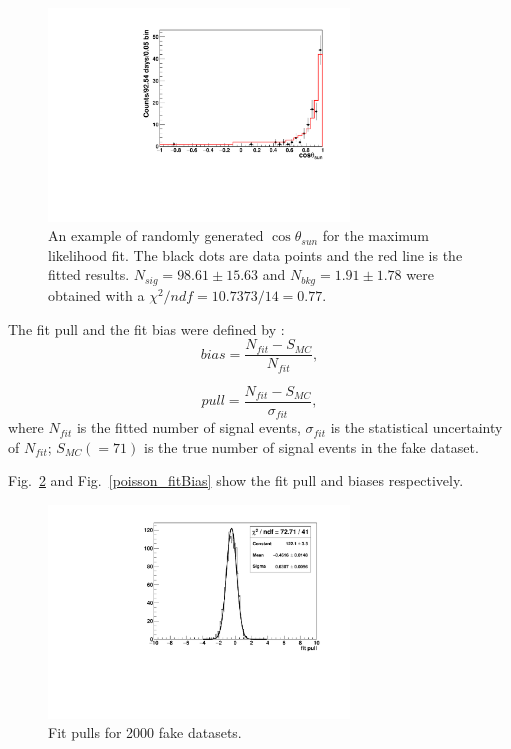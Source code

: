 \begin{figure}[!htb]
	\centering
	\includegraphics[width=8cm]{ensemble_fitExample.pdf}
	\caption{An example of randomly generated $\cos\theta_{sun}$ for the maximum likelihood fit. The black dots are data points and the red line is the fitted results. 
	$N_{sig} = 98.61\pm15.63$ and $N_{bkg} = 1.91 \pm 1.78$ were obtained with a $\chi^2/ndf = 10.7373/14 = 0.77$.}
	\label{ensemble_test}
\end{figure} 

The fit pull and the fit bias were defined by \cite{leta}:
\begin{equation}
bias=\frac{N_{fit}-S_{MC}}{N_{fit}},
\end{equation}

\begin{equation}
pull=\frac{N_{fit}-S_{MC}}{\sigma_{fit}},
\end{equation}
where $N_{fit}$ is the fitted number of signal events, $\sigma_{fit}$ is the statistical uncertainty of $N_{fit}$; $S_{MC}(=71)$ is the true number of signal events in the fake dataset.

Fig.~\ref{poisson_fitPull} and Fig.~\ref{poisson_fitBias} show the fit pull and biases respectively.

\begin{figure}[!htb]
	\centering
	\includegraphics[width=8cm]{ensemble_fitPull.pdf}
	\caption{Fit pulls for 2000 fake datasets.}
	\label{poisson_fitPull}
\end{figure} 

